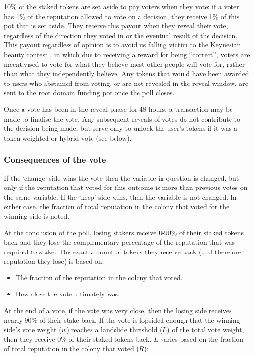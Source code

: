 10\% of the staked tokens are set aside to pay voters when they vote: if a voter has 1\% of the reputation allowed to vote on a decision, they receive 1\% of this pot that is set aside. They receive this payout when they reveal their vote, regardless of the direction they voted in or the eventual result of the decision. This payout regardless of opinion is to avoid us falling victim to the Keynesian beauty contest \cite{KeynesianBeauty}, in which due to receiving a reward for being “correct”, voters are incentivised to vote for what they believe most other people will vote for, rather than what they independently believe. Any tokens that would have been awarded to users who abstained from voting, or are not revealed in the reveal window, are sent to the root domain funding pot once the poll closes.

Once a vote has been in the reveal phase for 48 hours, a transaction may be made to finalise the vote. Any subsequent reveals of votes do not contribute to the decision being made, but serve only to unlock the user's tokens if it was a token-weighted or hybrid vote (see below).

\subsubsection*{Consequences of the vote}

If the `change' side wins the vote then the variable in question is changed, but only if the reputation that voted for this outcome is more than previous votes on the same variable. If the `keep' side wins, then the variable is not changed. In either case, the fraction of total reputation in the colony that voted for the winning side is noted.

At the conclusion of the poll, losing stakers receive 0-90\% of their staked tokens back and they lose the  complementary percentage of the reputation that was required to stake. The exact amount of tokens they receive back (and therefore reputation they lose) is based on:

\begin{itemize}
 \item The fraction of the reputation in the colony that voted.
 \item How close the vote ultimately was.
\end{itemize}

At the end of a vote, if the vote was very close, then the losing side receives nearly 90\% of their stake back. If the vote is lopsided enough that the winning side's vote weight ($w$) reaches a landslide threshold ($L$) of the total vote weight, then they receive 0\% of their staked tokens back. $L$ varies based on the fraction of total reputation in the colony that voted ($R$):

